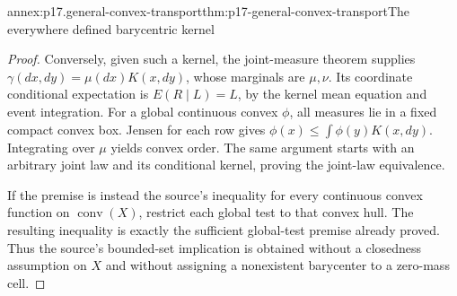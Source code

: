 \begin{annexitem}{annex:p17.general-convex-transport}{thm:p17-general-convex-transport}{The everywhere defined barycentric kernel}
\begin{proof}
Conversely, given such a kernel, the joint-measure theorem supplies
\(\gamma(dx,dy)=\mu(dx)K(x,dy)\), whose marginals are \(\mu,\nu\).
Its coordinate conditional expectation is \(E(R\mid L)=L\), by
the kernel mean equation and event integration.
For a global continuous convex \(\phi\), all measures lie in a
fixed compact convex box. Jensen for each row gives
\(\phi(x)\leq\int\phi(y)K(x,dy)\).
Integrating over \(\mu\) yields convex order.
The same argument starts with an arbitrary joint law and its
conditional kernel, proving the joint-law equivalence.

If the premise is instead the source's inequality for every continuous
convex function on \(\operatorname{conv}(X)\), restrict each global
test to that convex hull. The resulting inequality is exactly the
sufficient global-test premise already proved.
Thus the source's bounded-set implication is obtained without a
closedness assumption on \(X\) and without assigning a nonexistent
barycenter to a zero-mass cell.
\end{proof}
\end{annexitem}

